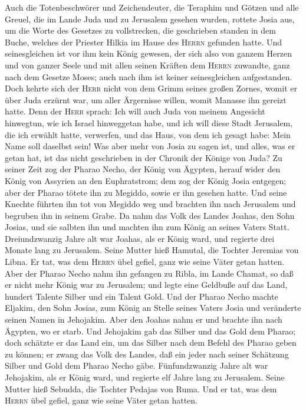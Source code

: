Auch die Totenbeschwörer und Zeichendeuter, die Teraphim und Götzen und
alle Greuel, die im Lande Juda und zu Jerusalem gesehen wurden, rottete
Josia aus, um die Worte des Gesetzes zu vollstrecken, die geschrieben
standen in dem Buche, welches der Priester Hilkia im Hause des
\textsc{Herrn} gefunden hatte.  Und seinesgleichen ist
vor ihm kein König gewesen, der sich also von ganzem Herzen und von
ganzer Seele und mit allen seinen Kräften dem \textsc{Herrn} zuwandte,
ganz nach dem Gesetze Moses; auch nach ihm ist keiner seinesgleichen
aufgestanden.  Doch kehrte sich der \textsc{Herr} nicht
von dem Grimm seines großen Zornes, womit er über Juda erzürnt war, um
aller Ärgernisse willen, womit Manasse ihn gereizt hatte.
 Denn der \textsc{Herr} sprach: Ich will auch Juda von
meinem Angesicht hinwegtun, wie ich Israel hinweggetan habe, und ich
will diese Stadt Jerusalem, die ich erwählt hatte, verwerfen, und das
Haus, von dem ich gesagt habe: Mein Name soll daselbst sein!
 Was aber mehr von Josia zu sagen ist, und alles, was er
getan hat, ist das nicht geschrieben in der Chronik der Könige von Juda?
 Zu seiner Zeit zog der Pharao Necho, der König von
Ägypten, herauf wider den König von Assyrien an den Euphratstrom; dem
zog der König Josia entgegen; aber der Pharao tötete ihn zu Megiddo,
sowie er ihn gesehen hatte.  Und seine Knechte führten
ihn tot von Megiddo weg und brachten ihn nach Jerusalem und begruben ihn
in seinem Grabe. Da nahm das Volk des Landes Joahas, den Sohn Josias,
und sie salbten ihn und machten ihn zum König an seines Vaters Statt.
 Dreiundzwanzig Jahre alt war Joahas, als er König ward,
und regierte drei Monate lang zu Jerusalem. Seine Mutter hieß Hamutal,
die Tochter Jeremias von Libna.  Er tat, was dem
\textsc{Herrn} übel gefiel, ganz wie seine Väter getan hatten.
 Aber der Pharao Necho nahm ihn gefangen zu Ribla, im
Lande Chamat, so daß er nicht mehr König war zu Jerusalem; und legte
eine Geldbuße auf das Land, hundert Talente Silber und ein Talent Gold.
 Und der Pharao Necho machte Eljakim, den Sohn Josias,
zum König an Stelle seines Vaters Josia und veränderte seinen Namen in
Jehojakim. Aber den Joahas nahm er und brachte ihn nach Ägypten, wo er
starb.  Und Jehojakim gab das Silber und das Gold dem
Pharao; doch schätzte er das Land ein, um das Silber nach dem Befehl des
Pharao geben zu können; er zwang das Volk des Landes, daß ein jeder nach
seiner Schätzung Silber und Gold dem Pharao Necho gäbe. 
Fünfundzwanzig Jahre alt war Jehojakim, als er König ward, und regierte
elf Jahre lang zu Jerusalem. Seine Mutter hieß Sebudda, die Tochter
Pedajas von Ruma.  Und er tat, was dem \textsc{Herrn}
übel gefiel, ganz wie seine Väter getan hatten.

